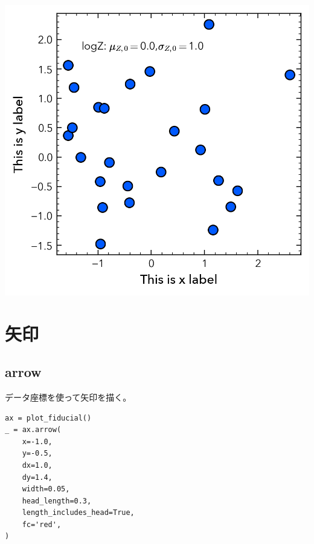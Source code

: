 \documentclass[a4paper, 10pt, notitlepage, twocolumn, uplatex, oneside, dvipdfmx]{jsarticle}
\begin{document}
\begin{center}
\includegraphics[width=1.0\linewidth]{./obipy-resources/params_text_fstring_latex.png}
\end{center}
\section{矢印}
\label{sec:orgdf8320b}
\subsection{arrow}
\label{sec:orgd1c79fc}
データ座標を使って矢印を描く。
\begin{verbatim}
ax = plot_fiducial()
_ = ax.arrow(
    x=-1.0,
    y=-0.5,
    dx=1.0,
    dy=1.4,
    width=0.05,
    head_length=0.3,
    length_includes_head=True,
    fc='red',
)
\end{verbatim}
\end{document}
